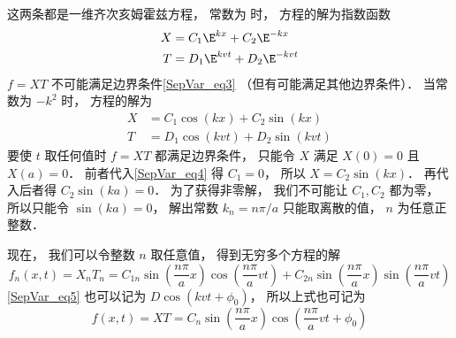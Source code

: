 这两条都是一维齐次亥姆霍兹方程， 常数为 时， 方程的解为指数函数
\begin{align}
X &= C_1 \E^{kx} + C_2 \E^{-kx}\\
T &= D_1 \E^{kvt} + D_2 \E^{-kvt}
\end{align}
$f = XT$ 不可能满足边界条件\autoref{SepVar_eq3}  （但有可能满足其他边界条件）． 当常数为 $-k^2$ 时， 方程的解为
\begin{align}\label{SepVar_eq4}
X &= C_1 \cos(kx) + C_2 \sin(kx)\\
\label{SepVar_eq5}T &= D_1 \cos(kvt) + D_2 \sin(kvt)
\end{align}
要使 $t$ 取任何值时 $f = XT$ 都满足边界条件， 只能令 $X$ 满足 $X(0) = 0$ 且 $X(a) = 0$． 前者代入\autoref{SepVar_eq4} 得 $C_1 = 0$， 所以 $X = C_2\sin(kx)$． 再代入后者得 $C_2\sin(ka) = 0$． 为了获得非零解， 我们不可能让 $C_1, C_2$ 都为零， 所以只能令 $\sin(ka) = 0$， 解出常数 $k_n = n\pi/a$ 只能取离散的值， $n$ 为任意正整数．

现在， 我们可以令整数 $n$ 取任意值， 得到无穷多个方程的解
\begin{equation}
f_n(x, t) = X_n T_n = C_{1n} \sin(\frac{n\pi}{a}x)\cos(\frac{n\pi}{a} vt) + C_{2n}\sin(\frac{n\pi}{a}x)\sin(\frac{n\pi}{a}vt)
\end{equation}
\autoref{SepVar_eq5} 也可以记为 $D\cos(kvt+\phi_0)$， 所以上式也可记为
\begin{equation}
f(x, t) = XT = C_n\sin(\frac{n\pi}{a}x)\cos(\frac{n\pi}{a}vt + \phi_0)
\end{equation}

